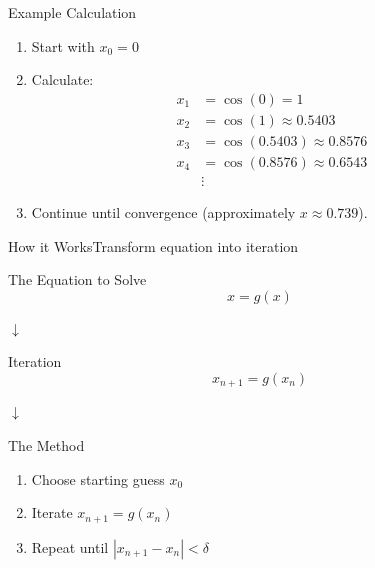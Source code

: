 \documentclass[10pt]{beamer}
\begin{document}
\begin{frame}{Example Calculation}
    \begin{enumerate}
        \item Start with \( x_0 = 0 \)
        \item Calculate:
        \begin{align*}
            x_1 &= \cos(0) = 1 \\
            x_2 &= \cos(1) \approx 0.5403 \\
            x_3 &= \cos(0.5403) \approx 0.8576 \\
            x_4 &= \cos(0.8576) \approx 0.6543 \\
            & \vdots
        \end{align*}
        \item Continue until convergence (approximately \( x \approx 0.739 \)).
    \end{enumerate}
\end{frame}


\begin{frame}{How it Works}{Transform equation into iteration}
    
    \begin{block}{The Equation to Solve}
        $$x = g(x)$$
    \end{block}
\begin{center} 
$\downarrow$ 
\end{center} \vspace{-2mm}
\begin{block}{Iteration}
\begin{equation*}
    x_{n+1} = g(x_{n})
\end{equation*}
\end{block}
\begin{center} 
$\downarrow$ 
\end{center}\vspace{-2mm}
\begin{block}{The Method}
\begin{enumerate}
    \item Choose starting guess $x_0$
    \item Iterate $x_{n+1} = g(x_n)$
    \item Repeat until $|x_{n+1} - x_n| < \delta$
\end{enumerate}
\end{block}
\end{frame}
\end{document}
